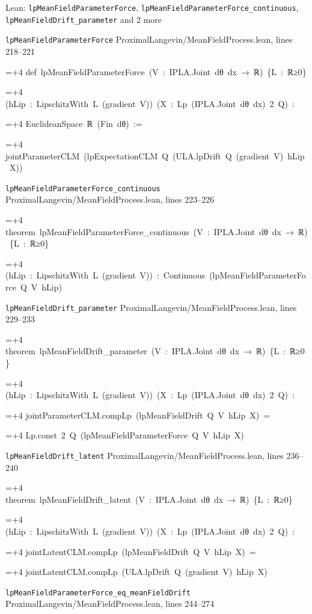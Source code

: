 \documentclass[11pt,a4paper]{report}
\newlength{\leancharwidth}
\newenvironment{leancode}{\par\smallskip\begingroup\ttfamily\footnotesize\raggedright
  \settowidth{\leancharwidth}{M}\setlength{\parskip}{0pt}\setlength{\parindent}{0pt}
  \frenchspacing}{\par\endgroup\smallskip}
\newcommand{\leanline}[2]{\hangindent=\dimexpr#1\leancharwidth+4\leancharwidth\relax
  \hangafter=1\noindent\hspace*{#1\leancharwidth}#2\par}
\newcommand{\leansource}[1]{\par{\footnotesize\color{leanmuted}#1}\par}
\begin{document}
\begin{leanbox}{Lean: \texttt{lpMeanFieldParameterForce}, \texttt{lpMeanFieldParameterForce\_\allowbreak{}continuous}, \texttt{lpMeanFieldDrift\_\allowbreak{}parameter} and 2 more}
\leansource{\texttt{lpMeanFieldParameterForce} \quad ProximalLangevin/\allowbreak{}MeanFieldProcess.lean, lines 218–221}
\begin{leancode}
\leanline{0}{def\ lpMeanFieldParameterForce\ (V\ :\ IPLA.Joint\ dθ\ dx\ →\ ℝ)\ \{L\ :\ ℝ≥0\}}
\leanline{4}{(hLip\ :\ LipschitzWith\ L\ (gradient\ V))\ (X\ :\ Lp\ (IPLA.Joint\ dθ\ dx)\ 2\ Q)\ :}
\leanline{4}{EuclideanSpace\ ℝ\ (Fin\ dθ)\ :=}
\leanline{2}{jointParameterCLM\ (lpExpectationCLM\ Q\ (ULA.lpDrift\ Q\ (gradient\ V)\ hLip\ X))}
\end{leancode}
\leansource{\texttt{lpMeanFieldParameterForce\_\allowbreak{}continuous} \quad ProximalLangevin/\allowbreak{}MeanFieldProcess.lean, lines 223–226}
\begin{leancode}
\leanline{0}{theorem\ lpMeanFieldParameterForce\_continuous\ (V\ :\ IPLA.Joint\ dθ\ dx\ →\ ℝ)\ \{L\ :\ ℝ≥0\}}
\leanline{4}{(hLip\ :\ LipschitzWith\ L\ (gradient\ V))\ :\ Continuous\ (lpMeanFieldParameterForce\ Q\ V\ hLip)}
\end{leancode}
\leansource{\texttt{lpMeanFieldDrift\_\allowbreak{}parameter} \quad ProximalLangevin/\allowbreak{}MeanFieldProcess.lean, lines 229–233}
\begin{leancode}
\leanline{0}{theorem\ lpMeanFieldDrift\_parameter\ (V\ :\ IPLA.Joint\ dθ\ dx\ →\ ℝ)\ \{L\ :\ ℝ≥0\}}
\leanline{4}{(hLip\ :\ LipschitzWith\ L\ (gradient\ V))\ (X\ :\ Lp\ (IPLA.Joint\ dθ\ dx)\ 2\ Q)\ :}
\leanline{4}{jointParameterCLM.compLp\ (lpMeanFieldDrift\ Q\ V\ hLip\ X)\ =}
\leanline{6}{Lp.const\ 2\ Q\ (lpMeanFieldParameterForce\ Q\ V\ hLip\ X)}
\end{leancode}
\leansource{\texttt{lpMeanFieldDrift\_\allowbreak{}latent} \quad ProximalLangevin/\allowbreak{}MeanFieldProcess.lean, lines 236–240}
\begin{leancode}
\leanline{0}{theorem\ lpMeanFieldDrift\_latent\ (V\ :\ IPLA.Joint\ dθ\ dx\ →\ ℝ)\ \{L\ :\ ℝ≥0\}}
\leanline{4}{(hLip\ :\ LipschitzWith\ L\ (gradient\ V))\ (X\ :\ Lp\ (IPLA.Joint\ dθ\ dx)\ 2\ Q)\ :}
\leanline{4}{jointLatentCLM.compLp\ (lpMeanFieldDrift\ Q\ V\ hLip\ X)\ =}
\leanline{6}{jointLatentCLM.compLp\ (ULA.lpDrift\ Q\ (gradient\ V)\ hLip\ X)}
\end{leancode}
\leansource{\texttt{lpMeanFieldParameterForce\_\allowbreak{}eq\_\allowbreak{}meanFieldDrift} \quad ProximalLangevin/\allowbreak{}MeanFieldProcess.lean, lines 244–274}

\end{leanbox}
\end{document}
